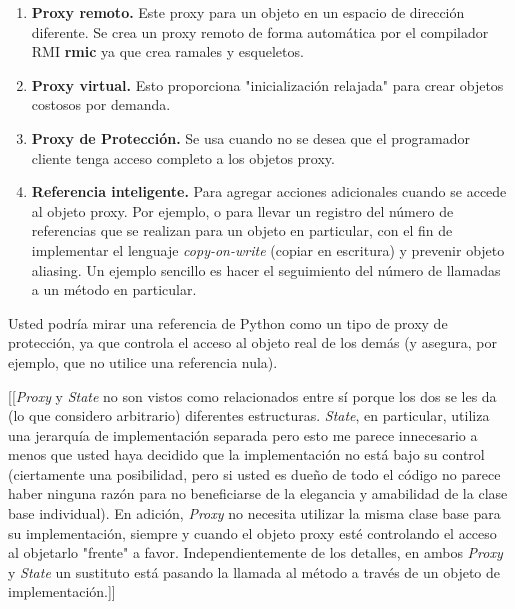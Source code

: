 \begin{enumerate}[1.]

    \item \textbf{Proxy remoto.} Este proxy para un objeto en un espacio de dirección diferente. Se crea un proxy remoto de forma automática por el compilador RMI \textbf{rmic} ya que crea ramales y esqueletos.
    
    \item \textbf{Proxy virtual.} Esto proporciona "inicialización relajada" para crear objetos costosos por demanda.
    
    \item \textbf{Proxy de Protección.} Se usa cuando no se desea que el programador cliente tenga acceso completo a los objetos proxy.
    
    \item \textbf{Referencia inteligente.} Para agregar acciones adicionales cuando se accede al objeto proxy. Por ejemplo, o para llevar un registro del número de referencias que se realizan para un objeto en particular, con el fin de implementar el lenguaje \textit{copy-on-write} (copiar en escritura) y prevenir objeto aliasing.
    Un ejemplo sencillo es hacer el seguimiento del número de llamadas a un método en particular.
    
\end{enumerate}

Usted podría mirar una referencia de Python como un tipo de proxy de protección, ya que controla el acceso al objeto real de los demás (y asegura, por ejemplo, que no utilice una referencia nula). \newline

[[\textit{Proxy} y \textit{State} no son vistos como relacionados entre sí porque los dos se les da (lo que considero arbitrario) diferentes estructuras.
\textit{State}, en particular, utiliza una jerarquía de implementación separada pero esto me parece innecesario a menos que usted haya decidido que la implementación no está bajo su control (ciertamente una posibilidad, pero si usted es dueño de todo el código no parece haber ninguna razón para no beneficiarse de la elegancia y amabilidad de la clase base individual). En adición, \textit{Proxy} no necesita utilizar la misma clase base para su implementación, siempre y cuando el objeto proxy esté controlando el acceso al objetarlo "frente" a favor. %
Independientemente de los detalles, en ambos \textit{Proxy} y \textit{State} un sustituto está pasando la llamada al método a través de un objeto de implementación.]]

